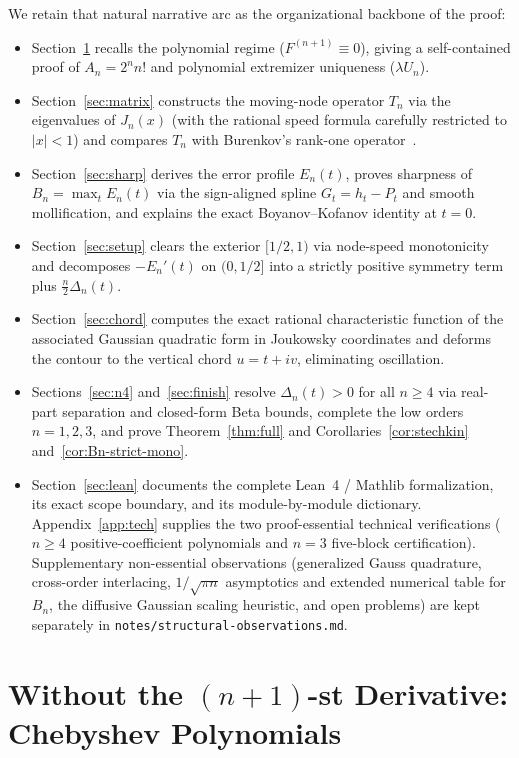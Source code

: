 \documentclass[11pt,a4paper]{article}
\newcommand{\code}[1]{\nolinkurl{#1}}
\theoremstyle{remark}
\numberwithin{equation}{section}
\begin{document}
We retain that natural narrative arc as the organizational backbone of the proof:
\begin{itemize}[leftmargin=1.8em]
    \item Section~\ref{sec:poly} recalls the polynomial regime ($F^{(n+1)} \equiv 0$), giving a self-contained proof of $A_n = 2^n n!$ and polynomial extremizer uniqueness ($\lambda U_n$).
    \item Section~\ref{sec:matrix} constructs the moving-node operator $T_n$ via the eigenvalues of $J_n(x)$ (with the rational speed formula carefully restricted to $|x| < 1$) and compares $T_n$ with Burenkov's rank-one operator~\cite{Burenkov1986}.
    \item Section~\ref{sec:sharp} derives the error profile $E_n(t)$, proves sharpness of $B_n = \max_t E_n(t)$ via the sign-aligned spline $G_t = h_t - P_t$ and smooth mollification, and explains the exact Boyanov--Kofanov identity at $t = 0$.
    \item Section~\ref{sec:setup} clears the exterior $[1/2, 1)$ via node-speed monotonicity and decomposes $-E_n'(t)$ on $(0, 1/2]$ into a strictly positive symmetry term plus $\frac{n}{2}\Delta_n(t)$.
    \item Section~\ref{sec:chord} computes the exact rational characteristic function of the associated Gaussian quadratic form in Joukowsky coordinates and deforms the contour to the vertical chord $u = t + iv$, eliminating oscillation.
    \item Sections~\ref{sec:n4} and~\ref{sec:finish} resolve $\Delta_n(t) > 0$ for all $n \ge 4$ via real-part separation and closed-form Beta bounds, complete the low orders $n = 1, 2, 3$, and prove Theorem~\ref{thm:full} and Corollaries~\ref{cor:stechkin} and~\ref{cor:Bn-strict-mono}.
    \item Section~\ref{sec:lean} documents the complete Lean~4 / Mathlib formalization, its exact scope boundary, and its module-by-module dictionary. Appendix~\ref{app:tech} supplies the two proof-essential technical verifications ($n \ge 4$ positive-coefficient polynomials and $n = 3$ five-block certification). Supplementary non-essential observations (generalized Gauss quadrature, cross-order interlacing, $1/\sqrt{\pi n}$ asymptotics and extended numerical table for $B_n$, the diffusive Gaussian scaling heuristic, and open problems) are kept separately in \code{notes/structural-observations.md}.
\end{itemize}

\section{Without the \texorpdfstring{$(n+1)$}{(n+1)}-st Derivative: Chebyshev Polynomials}
\label{sec:poly}
\end{document}
